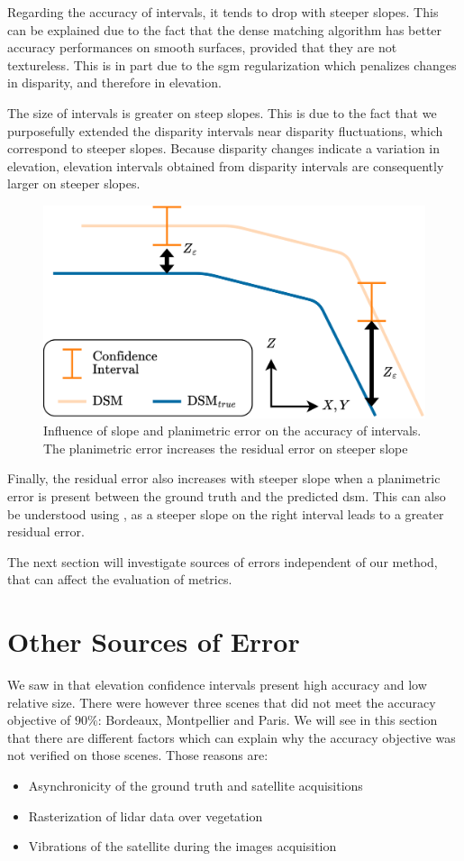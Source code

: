 Regarding the accuracy of intervals, it tends to drop with steeper slopes. This can be explained due to the fact that the dense matching algorithm has better accuracy performances on smooth surfaces, provided that they are not textureless. This is in part due to the \acrshort{sgm} regularization which penalizes changes in disparity, and therefore in elevation. 

The size of intervals is greater on steep slopes. This is due to the fact that we purposefully extended the disparity intervals near disparity fluctuations, which correspond to steeper slopes. Because disparity changes indicate a variation in elevation, elevation intervals obtained from disparity intervals are consequently larger on steeper slopes. 

\begin{figure}
    \centering
    \includegraphics[width=0.7\linewidth]{Images/Chap_6/Slope_effect_error.png}
    \caption{Influence of slope and planimetric error on the accuracy of intervals. The planimetric error increases the residual error on steeper slope}
    \label{fig:Slope_effect_error}
\end{figure}

Finally, the residual error also increases with steeper slope when a planimetric error is present between the ground truth and the predicted \acrshort{dsm}. This can also be understood using , as a steeper slope on the right interval leads to a greater residual error.

The next section will investigate sources of errors independent of our method, that can affect the evaluation of metrics.

\section{Other Sources of Error}\label{sec:other_errors}
We saw in  that elevation confidence intervals present high accuracy and low relative size. There were however three scenes that did not meet the accuracy objective of $90\%$: Bordeaux, Montpellier and Paris. We will see in this section that there are different factors which can explain why the accuracy objective was not verified on those scenes. Those reasons are: 
\begin{itemize}
    \item Asynchronicity of the ground truth and satellite acquisitions
    \item Rasterization of \acrshort{lidar} data over vegetation
    \item Vibrations of the satellite during the images acquisition
\end{itemize}

